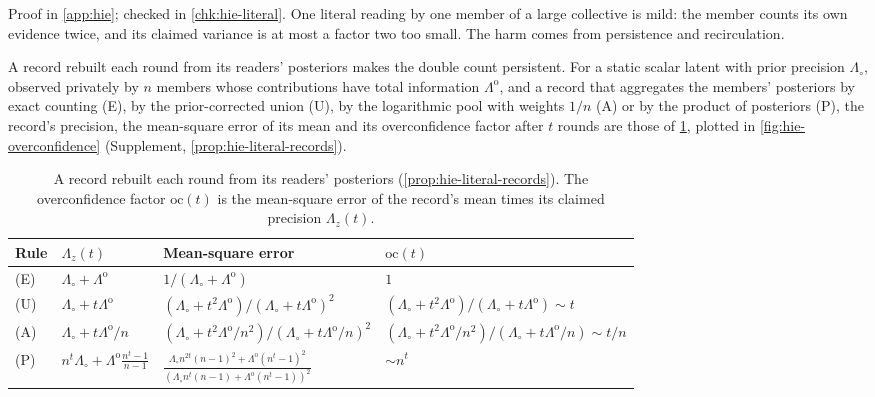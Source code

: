 Proof in \cref{app:hie}; checked in \cref{chk:hie-literal}. One literal reading by one member of a large collective is mild: the member counts its own evidence twice, and its claimed variance is at most a factor two too small. The harm comes from persistence and recirculation.

A record rebuilt each round from its readers' posteriors makes the double count persistent. For a static scalar latent with prior precision $\Lambda_\circ$, observed privately by $n$ members whose contributions have total information $\Lambda^{\mathrm o}$, and a record that aggregates the members' posteriors by exact counting (E), by the prior-corrected union (U), by the logarithmic pool with weights $1/n$ (A) or by the product of posteriors (P), the record's precision, the mean-square error of its mean and its overconfidence factor after $t$ rounds are those of \cref{tab:hie-records}, plotted in \cref{fig:hie-overconfidence} (Supplement, \cref{prop:hie-literal-records}).

\begin{table}[t]
\centering
\small
\begin{tabular}{@{}llll@{}}
\toprule
Rule & $\Lambda_z(t)$ & Mean-square error & $\mathrm{oc}(t)$\\
\midrule
(E) & $\Lambda_\circ+\Lambda^{\mathrm o}$ & $1/(\Lambda_\circ+\Lambda^{\mathrm o})$ & $1$\\
(U) & $\Lambda_\circ+t\Lambda^{\mathrm o}$ & $(\Lambda_\circ+t^2\Lambda^{\mathrm o})/(\Lambda_\circ+t\Lambda^{\mathrm o})^2$ & $(\Lambda_\circ+t^2\Lambda^{\mathrm o})/(\Lambda_\circ+t\Lambda^{\mathrm o})\sim t$\\
(A) & $\Lambda_\circ+t\Lambda^{\mathrm o}/n$ & $(\Lambda_\circ+t^2\Lambda^{\mathrm o}/n^2)/(\Lambda_\circ+t\Lambda^{\mathrm o}/n)^2$ & $(\Lambda_\circ+t^2\Lambda^{\mathrm o}/n^2)/(\Lambda_\circ+t\Lambda^{\mathrm o}/n)\sim t/n$\\
(P) & $n^t\Lambda_\circ+\Lambda^{\mathrm o}\frac{n^t-1}{n-1}$ & $\frac{\Lambda_\circ n^{2t}(n-1)^2+\Lambda^{\mathrm o}(n^t-1)^2}{(\Lambda_\circ n^t(n-1)+\Lambda^{\mathrm o}(n^t-1))^2}$ & $\sim n^t$\\
\bottomrule
\end{tabular}
\caption{A record rebuilt each round from its readers' posteriors (\cref{prop:hie-literal-records}). The overconfidence factor $\mathrm{oc}(t)$ is the mean-square error of the record's mean times its claimed precision $\Lambda_z(t)$.}
\label{tab:hie-records}
\end{table}

